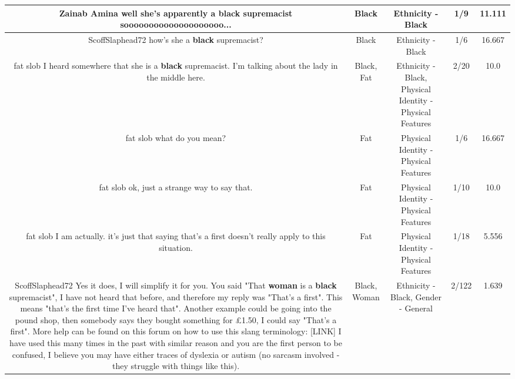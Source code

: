 \documentclass[11pt]{article}
\newlength\mylength
\begin{document}
\begin{center}
\begin{longtable}{|C{.65\mylength}|C{.30\mylength}|C{.12\mylength}|C{.12\mylength}|C{.12\mylength}|}
  \small Zainab Amina well she's apparently a \textbf{black} supremacist soooooooooooooooooooo...\normalsize   & Black & Ethnicity - Black & 1/9 & 11.111 \\  \hline
  \small ScoffSlaphead72 how's she a \textbf{black} supremacist?\normalsize   & Black & Ethnicity - Black & 1/6 & 16.667 \\  \hline
  \small fat slob I heard somewhere that she is a \textbf{black} supremacist. I'm talking about the lady in the middle here.\normalsize   & Black, Fat & Ethnicity - Black, Physical Identity - Physical Features & 2/20 & 10.0 \\  \hline
  \small fat slob what do you mean?\normalsize   & Fat & Physical Identity - Physical Features & 1/6 & 16.667 \\  \hline
  \small fat slob ok, just a strange way to say that.\normalsize   & Fat & Physical Identity - Physical Features & 1/10 & 10.0 \\  \hline
  \small fat slob I am actually. it's just that saying that's a first doesn't really apply to this situation.\normalsize   & Fat & Physical Identity - Physical Features & 1/18 & 5.556 \\  \hline
  \small ScoffSlaphead72 Yes it does, I will simplify it for you. You said "That \textbf{woman} is a \textbf{black} supremacist", I have not heard that before, and therefore my reply was "That's a first". This means "that's the first time I've heard that". Another example could be going into the pound shop, then somebody says they bought something for £1.50, I could say "That's a first". More help can be found on this forum on how to use this slang terminology:  [LINK]  I have used this many times in the past with similar reason and you are the first person to be confused, I believe you may have either traces of dyslexia or autism (no sarcasm involved - they struggle with things like this).\normalsize   & Black, Woman & Ethnicity - Black, Gender - General & 2/122 & 1.639 \\  \hline

\end{longtable}
\end{center}
\end{document}
